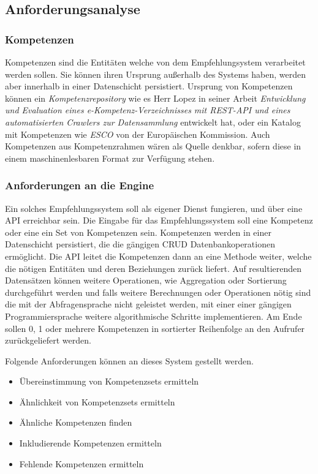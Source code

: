 \subsection{Anforderungsanalyse} 

\subsubsection{Kompetenzen}

Kompetenzen sind die Entitäten welche von dem Empfehlungsystem verarbeitet werden sollen. Sie können ihren Ursprung außerhalb des Systems haben, werden aber innerhalb in einer Datenschicht persistiert. Ursprung von Kompetenzen können ein \textit{Kompetenzrepository} wie es Herr Lopez in seiner Arbeit \textit{Entwicklung und Evaluation eines e-Kompetenz-Verzeichnisses mit REST-API und eines automatisierten Crawlers zur Datensammlung}\cite{lopez} entwickelt hat, oder ein Katalog mit Kompetenzen wie \textit{ESCO} von der Europäischen Kommission. Auch Kompetenzen aus Kompetenzrahmen wären als Quelle denkbar, sofern diese in einem maschinenlesbaren Format zur Verfügung stehen. 

\subsubsection{Anforderungen an die Engine}
Ein solches Empfehlungssystem soll als eigener Dienst fungieren, und über eine API erreichbar sein. Die Eingabe für das Empfehlungssystem soll eine Kompetenz oder eine ein Set von Kompetenzen sein. Kompetenzen werden in einer Datenschicht persistiert, die die gängigen CRUD Datenbankoperationen ermöglicht. Die API leitet die Kompetenzen dann an eine Methode weiter, welche die nötigen Entitäten und deren Beziehungen zurück liefert. Auf resultierenden Datensätzen können weitere Operationen, wie Aggregation oder Sortierung durchgeführt werden und falls weitere Berechnungen oder Operationen nötig sind die mit der Abfragensprache nicht geleistet werden, mit einer einer gängigen Programmiersprache weitere algorithmische Schritte implementieren. Am Ende sollen 0, 1 oder mehrere Kompetenzen in sortierter Reihenfolge an den Aufrufer zurückgeliefert werden.

Folgende Anforderungen können an dieses System gestellt werden.
\begin{itemize}
	\item Übereinstimmung von Kompetenzsets ermitteln
	\item Ähnlichkeit von Kompetenzsets ermitteln
	\item Ähnliche Kompetenzen finden
	\item Inkludierende Kompetenzen ermitteln
	\item Fehlende Kompetenzen ermitteln
\end{itemize}

